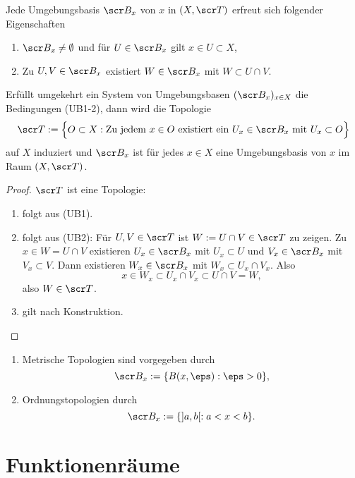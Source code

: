 \begin{st} \label{st:local_bases}
	Jede Umgebungsbasis $\scr B_x$ von $x$ in $(X, \scr T)$ erfreut sich folgender Eigenschaften
	\begin{enumerate}[(UB1)]
		\item
			$\scr B_x \neq \emptyset$ und für $U \in \scr B_x$ gilt $x \in U \subset X$,
		\item
			Zu $U,V \in \scr B_x$ existiert $W \in \scr B_x$ mit $W \subset U \cap V$.
	\end{enumerate}

	Erfüllt umgekehrt ein System von Umgebungsbasen $(\scr B_x)_{x\in X}$ die Bedingungen (UB1-2), dann wird die Topologie
	\[
		\scr T := \Big\{ O \subset X : \text{Zu jedem $x\in O$ existiert ein $U_x \in \scr B_x$ mit $U_x \subset O$} \Big\}
	\]
	auf $X$ induziert und
	$\scr B_x$ ist für jedes $x \in X$ eine Umgebungsbasis von $x$ im Raum $(X, \scr T)$.
	\begin{proof}
		$\scr T$ ist eine Topologie:
		\begin{enumerate}[(O1)]
			\item
				folgt aus (UB1).
			\item
				folgt aus (UB2):
				Für $U, V \in \scr T$ ist $W := U \cap V \in \scr T$ zu zeigen.
				Zu $x \in W = U \cap V$ existieren $U_x \in \scr B_x$ mit $U_x \subset U$ und $V_x \in \scr B_x$ mit $V_x \subset V$.
				Dann existieren $W_x \in \scr B_x$ mit $W_x \subset U_x \cap V_x$.
				Also
				\[
					x \in W_x \subset U_x \cap V_x \subset U \cap V = W,
				\]
				also $W \in \scr T$.
			\item
				gilt nach Konstruktion.
		\end{enumerate}
	\end{proof}
\end{st}

\begin{ex}
	\begin{enumerate}[1.)]
		\item
			Metrische Topologien sind vorgegeben durch
			\[
				\scr B_x := \{ B(x,\eps) : \eps > 0 \},
			\]
		\item
			Ordnungstopologien durch
			\[
				\scr B_x := \{ ]a,b[ : a < x < b \}.
			\]
	\end{enumerate}
\end{ex}

\section{Funktionenräume}


